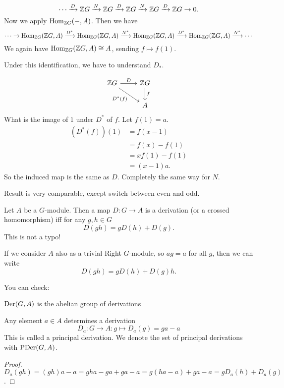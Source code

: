 \[
    \cdots \xrightarrow{D}  \mathbb{Z} G
    \xrightarrow{N} \mathbb{Z} G
    \xrightarrow{D}  \mathbb{Z} G
    \xrightarrow{N} \mathbb{Z} G
    \xrightarrow{D}  \mathbb{Z} G  \to  0
.\] 
Now we apply $ \operatorname{Hom}_{\mathbb{Z} G}(- , A)$.
Then we have
\[
    \cdots \to  
\operatorname{Hom}_{\mathbb{Z} G}(\mathbb{Z} G, A) \xrightarrow{D^*} 
\operatorname{Hom}_{\mathbb{Z} G}(\mathbb{Z} G, A) \xrightarrow{N^*} 
\operatorname{Hom}_{\mathbb{Z} G}(\mathbb{Z} G, A) \xrightarrow{D^*} 
\operatorname{Hom}_{\mathbb{Z} G}(\mathbb{Z} G, A) \xrightarrow{N^*} \cdots
\] 
We again have $\operatorname{Hom}_{\mathbb{Z} G}(\mathbb{Z} G, A) \cong A$, sending  $f \mapsto f(1)$.

Under this identification, we have to understand $D_*$. 

\[
    \begin{tikzcd}
        \Z G \arrow[r, "D"] \arrow[dr, "D^*(f)", swap]&\Z G \arrow[d, "f"]\\
                            & A
    \end{tikzcd}
\]
What is the image of $1$ under  $D^{*}$ of $f$.
Let $ f(1) = a$.
\begin{align*}
    (D^{*}(f))(1) &= f(x-1)\\
                  &= f(x) - f(1) \\
                  &= x f(1) - f(1)\\
                  &= (x-1) a
.\end{align*}
So the induced map is the same as $D$.
Completely the same way for $N$.

Result is very comparable, except switch between even and odd.


\begin{definition}
    Let $A$ be a $G$-module.
    Then a map $D: G \to  A$ is a derivation (or a crossed homomorphism) iff
    for any $g, h \in G$
    \[
        D(gh) = g D(h) + D(g)
    .\] 
    This is not a typo!
\end{definition}
\begin{remark}
    If we consider $A$ also as a trivial Right $G$-module, so $ag = a$ for all $g$, then we can write
    \[
        D(gh) = gD(h) + D(g) h
    .\] 
\end{remark}

You can check:
\begin{prop}
    $\operatorname{Der}(G, A)$ is the abelian group of derivations
\end{prop}

\begin{definition}
    Any element $a \in A$ determines a derivation \[
    D_a: G \to  A: g \mapsto D_a(g) = ga - a
\]
This is called a principal derivation.
We denote the set of principal derivations with $\operatorname{PDer}(G, A)$.
\end{definition}
\begin{proof}
    $D_a(gh) = (gh) a - a = gha - ga + ga - a = g(ha - a) + ga - a = g D_a(h) + D_a(g)$.
\end{proof}

